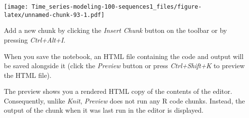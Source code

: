 \documentclass[
]{article}
\begin{document}
\texttt{[image: Time\_series-modeling-100-sequences1\_files/figure-latex/unnamed-chunk-93-1.pdf]}

Add a new chunk by clicking the \emph{Insert Chunk} button on the
toolbar or by pressing \emph{Ctrl+Alt+I}.

When you save the notebook, an HTML file containing the code and output
will be saved alongside it (click the \emph{Preview} button or press
\emph{Ctrl+Shift+K} to preview the HTML file).

The preview shows you a rendered HTML copy of the contents of the
editor. Consequently, unlike \emph{Knit}, \emph{Preview} does not run
any R code chunks. Instead, the output of the chunk when it was last run
in the editor is displayed.
\end{document}
